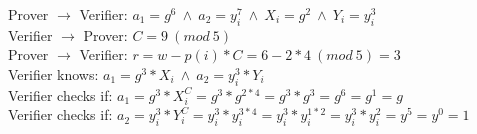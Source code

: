 \begin{infobox}
Prover \begin{math}\rightarrow\end{math} Verifier: \begin{math}a_1=g^6 \ \land\ a_2=y_i^7 \ \land \ X_i=g^2 \ \land \ Y_i=y_i^3 \end{math}\\
Verifier \begin{math}\rightarrow\end{math} Prover: \begin{math}C=9\ (mod \ 5) \end{math}\\
Prover \begin{math}\rightarrow\end{math} Verifier: \begin{math}r=w-p(i) * C = 6-2 * 4 \ (mod \ 5)= 3\end{math}\\
Verifier knows:  \begin{math}a_1=g^3 * X_i \ \land \ a_2=y_i^3 * Y_i \end{math}\\
Verifier checks if:  \begin{math}a_1 = g^3*X_i^C = g^3*g^{2*4} = g^3 * g^3 = g^6= g^1= g\end{math}\\
Verifier checks if:  \begin{math} a_2=y_i^3 * Y_i^C = y_i^3 * y_i^{3*4}= y_i^3 * y_i^{1*2}= y_i^3 * y_i^2= y^5=y^0= 1 \end{math}
\end{infobox}


